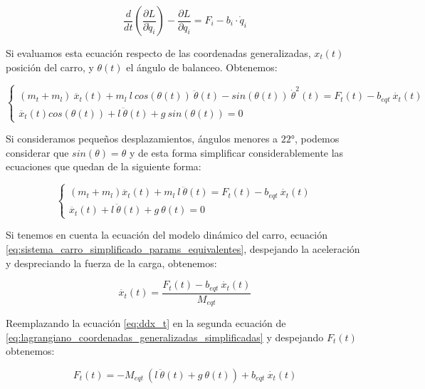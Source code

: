 \documentclass[11pt]{article}
\begin{document}
\begin{equation}
	\label{eq:lagrangiano_ecuacion_diferencial}
	\frac{d}{dt}\left ( \frac{\partial L}{\partial \dot{q}_{i}} \right ) -\frac{\partial L}{\partial q_{i}}=F_{i}-b_{i}\cdot \dot{q}_{i}
\end{equation}

Si evaluamos esta ecuación respecto de las coordenadas generalizadas, $x_{t}(t)$ posición del carro, y $\theta(t)$ el ángulo de balanceo. Obtenemos:

\begin{equation}
	\label{eq:lagrangiano_coordenadas_generalizadas}
	\left \{\begin{matrix}(m_t+m_l)\ \ddot{x_t}(t)+m_l\ l\ cos(\theta (t))\ \ddot{\theta }(t)-sin(\theta (t))\ \dot{\theta }^{2}(t)=F_t(t)-b_{eqt}\ \dot{x_t}(t)\\ \ddot{x_t}(t)cos(\theta (t))+l\ \ddot{\theta }(t)+g\ sin(\theta (t))=0\end{matrix}\right.
\end{equation}

Si consideramos pequeños desplazamientos, ángulos menores a $22°$, podemos considerar que $sin(\theta)=\theta$ y de esta forma simplificar considerablemente las ecuaciones que quedan de la siguiente forma:

\begin{equation}
	\label{eq:lagrangiano_coordenadas_generalizadas_simplificadas}
	\left \{\begin{matrix}(m_t+m_l)\ddot{x_t}(t)+m_l\ l\ \ddot{\theta }(t)=F_t(t)-b_{eqt}\ \dot{x_t}(t)\\ \ddot{x_t}(t)+l\ \ddot{\theta }(t)+g\ \theta (t)=0\end{matrix}\right.
\end{equation}

Si tenemos en cuenta la ecuación del modelo dinámico del carro, ecuación \ref{eq:sistema_carro_simplificado_params_equivalentes}, despejando la aceleración y despreciando la fuerza de la carga, obtenemos:

\begin{equation}
	\label{eq:ddx_t}
	\ddot{x_t}(t)=\frac{F_t(t)-b_{eqt}\ \dot{x_t}(t)}{M_{eqt}}
\end{equation}

Reemplazando la ecuación \ref{eq:ddx_t} en la segunda ecuación de \ref{eq:lagrangiano_coordenadas_generalizadas_simplificadas} y despejando $F_{t}(t)$ obtenemos:

\begin{equation}
	\label{eq:F_t}
	F_{t}(t)=-M_{eqt}\ \left ( l\ \ddot{\theta}(t)+g\ \theta(t) \right )+b_{eqt}\ \dot{x_t}(t)
\end{equation}
\end{document}

